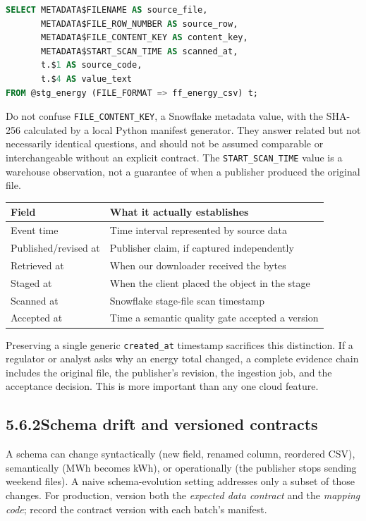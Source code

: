 \documentclass[11pt,twoside]{article}
\newcommand{\topic}[2]{\subsection*{#1\quad #2}}
\begin{document}
\begin{lstlisting}[language=SQL,caption={Preview row identity and staged-file metadata.}]
SELECT METADATA$FILENAME AS source_file,
       METADATA$FILE_ROW_NUMBER AS source_row,
       METADATA$FILE_CONTENT_KEY AS content_key,
       METADATA$START_SCAN_TIME AS scanned_at,
       t.$1 AS source_code,
       t.$4 AS value_text
FROM @stg_energy (FILE_FORMAT => ff_energy_csv) t;
\end{lstlisting}
Do not confuse \texttt{FILE\_CONTENT\_KEY}, a Snowflake metadata value, with the SHA-256 calculated by a local Python manifest generator. They answer related but not necessarily identical questions, and should not be assumed comparable or interchangeable without an explicit contract. The \texttt{START\_SCAN\_TIME} value is a warehouse observation, not a guarantee of when a publisher produced the original file.

\begin{center}\small\begin{tabularx}{\linewidth}{@{}p{35mm}X@{}}\toprule
Field & What it actually establishes\\\midrule
Event time & Time interval represented by source data\\
Published/revised at & Publisher claim, if captured independently\\
Retrieved at & When our downloader received the bytes\\
Staged at & When the client placed the object in the stage\\
Scanned at & Snowflake stage-file scan timestamp\\
Accepted at & Time a semantic quality gate accepted a version\\\bottomrule\end{tabularx}\end{center}
Preserving a single generic \texttt{created\_at} timestamp sacrifices this distinction. If a regulator or analyst asks why an energy total changed, a complete evidence chain includes the original file, the publisher's revision, the ingestion job, and the acceptance decision. This is more important than any one cloud feature.
\newpage
\topic{5.6.2}{Schema drift and versioned contracts}
A schema can change syntactically (new field, renamed column, reordered CSV), semantically (MWh becomes kWh), or operationally (the publisher stops sending weekend files). A naive schema-evolution setting addresses only a subset of those changes. For production, version both the \emph{expected data contract} and the \emph{mapping code}; record the contract version with each batch's manifest.
\end{document}
